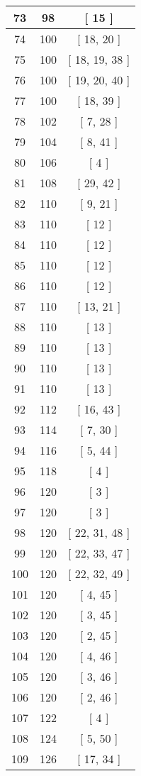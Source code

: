 \begin{center}
\begin{longtable}[H]{|| c c c ||}
\hline
73 & 98 & [ 15 ] \\ 
\hline
74 & 100 & [ 18, 20 ] \\ 
\hline
75 & 100 & [ 18, 19, 38 ] \\ 
\hline
76 & 100 & [ 19, 20, 40 ] \\ 
\hline
77 & 100 & [ 18, 39 ] \\ 
\hline
78 & 102 & [ 7, 28 ] \\ 
\hline
79 & 104 & [ 8, 41 ] \\ 
\hline
80 & 106 & [ 4 ] \\ 
\hline
81 & 108 & [ 29, 42 ] \\ 
\hline
82 & 110 & [ 9, 21 ] \\ 
\hline
83 & 110 & [ 12 ] \\ 
\hline
84 & 110 & [ 12 ] \\ 
\hline
85 & 110 & [ 12 ] \\ 
\hline
86 & 110 & [ 12 ] \\ 
\hline
87 & 110 & [ 13, 21 ] \\ 
\hline
88 & 110 & [ 13 ] \\ 
\hline
89 & 110 & [ 13 ] \\ 
\hline
90 & 110 & [ 13 ] \\ 
\hline
91 & 110 & [ 13 ] \\ 
\hline
92 & 112 & [ 16, 43 ] \\ 
\hline
93 & 114 & [ 7, 30 ] \\ 
\hline
94 & 116 & [ 5, 44 ] \\ 
\hline
95 & 118 & [ 4 ] \\ 
\hline
96 & 120 & [ 3 ] \\ 
\hline
97 & 120 & [ 3 ] \\ 
\hline
98 & 120 & [ 22, 31, 48 ] \\ 
\hline
99 & 120 & [ 22, 33, 47 ] \\ 
\hline
100 & 120 & [ 22, 32, 49 ] \\ 
\hline
101 & 120 & [ 4, 45 ] \\ 
\hline
102 & 120 & [ 3, 45 ] \\ 
\hline
103 & 120 & [ 2, 45 ] \\ 
\hline
104 & 120 & [ 4, 46 ] \\ 
\hline
105 & 120 & [ 3, 46 ] \\ 
\hline
106 & 120 & [ 2, 46 ] \\ 
\hline
107 & 122 & [ 4 ] \\ 
\hline
108 & 124 & [ 5, 50 ] \\ 
\hline
109 & 126 & [ 17, 34 ] \\ 

\end{longtable}
\end{center}
